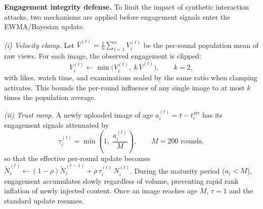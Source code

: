 
\textbf{Engagement integrity defense.}  To limit the impact of synthetic interaction attacks, two mechanisms are applied before engagement signals enter the EWMA/Bayesian update.

\emph{(i) Velocity clamp.}  Let $\bar{V}^{(t)} = \frac{1}{n}\sum_{i=1}^{n} V_i^{(t)}$ be the per-round population mean of raw views.  For each image, the observed engagement is clipped:
\begin{equation}
V_i^{(t)} \leftarrow \min\!\bigl(V_i^{(t)},\; k\,\bar{V}^{(t)}\bigr), \qquad k = 2,
\end{equation}
with likes, watch time, and examinations scaled by the same ratio when clamping activates.  This bounds the per-round influence of any single image to at most $k$ times the population average.

\emph{(ii) Trust ramp.}  A newly uploaded image of age $a_i^{(t)} = t - t_i^{\mathrm{arr}}$ has its engagement signals attenuated by
\begin{equation}
\tau_i^{(t)} = \min\!\left(1,\; \frac{a_i^{(t)}}{M}\right), \qquad M = 200\text{ rounds},
\end{equation}
so that the effective per-round update becomes $\tilde{N}_i^{(t)} \leftarrow (1-\rho)\tilde{N}_i^{(t-1)} + \rho\,\tau_i^{(t)}\,N_i^{(t)}$.  During the maturity period ($a_i < M$), engagement accumulates slowly regardless of volume, preventing rapid rank inflation of newly injected content.  Once an image reaches age $M$, $\tau = 1$ and the standard update resumes.
